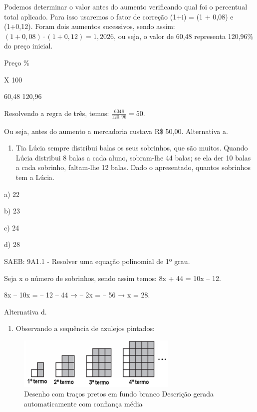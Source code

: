 \begin{escolha}
{{{\begin{escolha}
{{{{{\begin{escolha}
\begin{escolha}
{\begin{q°}
Podemos determinar o valor antes do aumento verificando qual foi o
percentual total aplicado. Para isso usaremos o fator de correção (1+i)
= (1 + 0,08) e (1+0,12). Foram dois aumentos sucessivos, sendo assim:
\(\left( 1 + 0,08 \right) \cdot \left( 1 + 0,12 \right) = 1,2026\), ou
seja, o valor de 60,48 representa 120,96\% do preço inicial.

Preço \%

X 100

60,48 120,96

Resolvendo a regra de três, temos: \(\frac{6048}{120,96} = 50\).

Ou seja, antes do aumento a mercadoria custava R\$ 50,00. Alternativa a.

\begin{enumerate}
\def\labelenumi{\arabic{enumi}.}
\setcounter{enumi}{4}
\tightlist
\item
  Tia Lúcia sempre distribui balas os seus sobrinhos, que são muitos.
  Quando Lúcia distribui 8 balas a cada aluno, sobram-lhe 44 balas; se
  ela der 10 balas a cada sobrinho, faltam-lhe 12 balas. Dado o
  apresentado, quantos sobrinhos tem a Lúcia.
\end{enumerate}

a) 22

b) 23

c) 24

d) 28

SAEB: 9A1.1 - Resolver uma equação polinomial de 1º grau.

Seja x o número de sobrinhos, sendo assim temos: 8x + 44 = 10x -- 12.

8x -- 10x = -- 12 -- 44 → -- 2x = -- 56 → x = 28.

Alternativa d.

\begin{enumerate}
\def\labelenumi{\arabic{enumi}.}
\setcounter{enumi}{5}
\tightlist
\item
  Observando a sequência de azulejos pintados:
\end{enumerate}

\begin{figure}
\centering
\includegraphics[width=3in,height=0.96526in]{./_SAEB_9_MAT/media/image270.png}
\caption{Desenho com traços pretos em fundo branco Descrição gerada
automaticamente com confiança média}
\end{figure}


\end{q°}}
\end{escolha}
\end{escolha}}}}}}
\end{escolha}}}}
\end{escolha}

